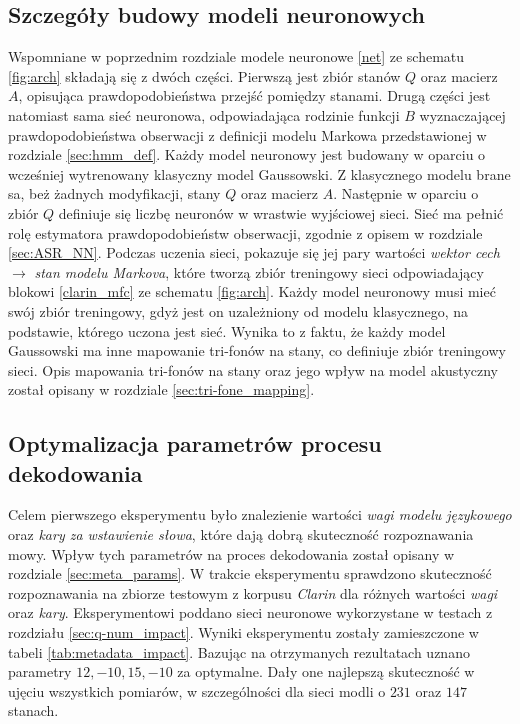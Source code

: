 \documentclass[11pt]{article}
\newcommand{\refBlock}[1]{%
	\hyperref[#1]{\ref*{#1}}%
}
\begin{document}
	\subsection{ Szczegóły budowy modeli neuronowych}
		\label{sec:nn_model_details}
		Wspomniane w poprzednim rozdziale modele neuronowe \refBlock{net} ze schematu \ref{fig:arch} składają się z dwóch części. Pierwszą jest zbiór stanów $Q$ oraz macierz $A$, opisująca prawdopodobieństwa przejść pomiędzy stanami. Drugą części jest natomiast sama sieć neuronowa, odpowiadająca rodzinie funkcji $B$ wyznaczającej prawdopodobieństwa obserwacji z definicji modelu Markowa przedstawionej w rozdziale \ref{sec:hmm_def}. Każdy model neuronowy jest budowany w oparciu o wcześniej wytrenowany klasyczny model Gaussowski. Z klasycznego modelu brane sa, beż żadnych modyfikacji, stany $Q$ oraz macierz $A$. Następnie w oparciu o zbiór $Q$ definiuje się liczbę neuronów w wrastwie wyjściowej sieci. Sieć ma pełnić rolę estymatora prawdopodobieństw obserwacji, zgodnie z opisem w rozdziale \ref{sec:ASR_NN}. Podczas uczenia sieci, pokazuje się jej pary wartości \textit{wektor cech} $\longrightarrow$ \textit{stan modelu Markova}, które tworzą zbiór treningowy sieci odpowiadający blokowi \refBlock{clarin_mfc} ze schematu \ref{fig:arch}. Każdy model neuronowy musi mieć swój zbiór treningowy, gdyż jest on uzależniony od modelu klasycznego, na podstawie, którego uczona jest sieć. Wynika to z faktu, że każdy model Gaussowski ma inne mapowanie tri-fonów na stany, co definiuje zbiór treningowy sieci. Opis mapowania tri-fonów na stany oraz jego wpływ na model akustyczny został opisany w rozdziale \ref{sec:tri-fone_mapping}.
	
	\subsection{ Optymalizacja parametrów procesu dekodowania }
		\label{sec:metadata_impact}
		Celem pierwszego eksperymentu było znalezienie wartości \textit{wagi modelu językowego} oraz \textit{kary za wstawienie słowa}, które dają dobrą skuteczność rozpoznawania mowy. Wpływ tych parametrów na proces dekodowania został opisany w rozdziale \ref{sec:meta_params}. W trakcie eksperymentu sprawdzono skuteczność rozpoznawania na zbiorze testowym z korpusu \textit{Clarin} dla różnych wartości \textit{wagi} oraz \textit{kary}. Eksperymentowi poddano sieci neuronowe wykorzystane w testach z rozdziału \ref{sec:q-num_impact}. Wyniki eksperymentu zostały zamieszczone w tabeli \ref{tab:metadata_impact}. Bazując na otrzymanych rezultatach uznano parametry $12, -10, 15, -10$ za optymalne. Dały one najlepszą skuteczność w ujęciu wszystkich pomiarów, w szczególności dla sieci modli o $231$ oraz $147$ stanach.
		
\end{document}
